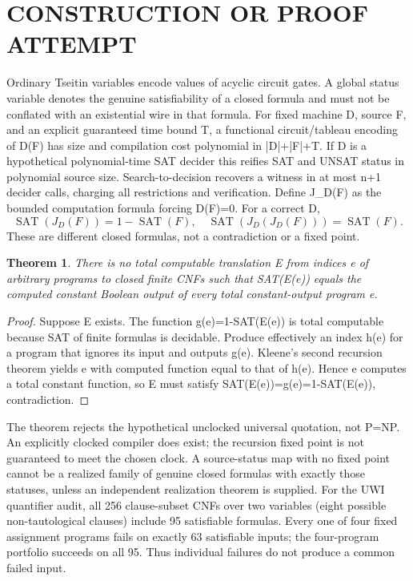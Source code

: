 \documentclass{article}
\newtheorem{theorem}{Theorem}
\begin{document}
\section{CONSTRUCTION OR PROOF ATTEMPT}
Ordinary Tseitin variables encode values of acyclic circuit gates. A global status variable denotes the genuine satisfiability of a closed formula and must not be conflated with an existential wire in that formula.
For fixed machine D, source F, and an explicit guaranteed time bound T, a functional circuit/tableau encoding of D(F) has size and compilation cost polynomial in |D|+|F|+T. If D is a hypothetical polynomial-time SAT decider this reifies SAT and UNSAT status in polynomial source size. Search-to-decision recovers a witness in at most n+1 decider calls, charging all restrictions and verification.
Define J_D(F) as the bounded computation formula forcing D(F)=0. For a correct D,
\[
\operatorname{SAT}(J_D(F))=1-\operatorname{SAT}(F),\quad
\operatorname{SAT}(J_D(J_D(F)))=\operatorname{SAT}(F).
\]
These are different closed formulas, not a contradiction or a fixed point.
\begin{theorem}
There is no total computable translation E from indices e of arbitrary programs to closed finite CNFs such that SAT(E(e)) equals the computed constant Boolean output of every total constant-output program e.
\end{theorem}
\begin{proof}
Suppose E exists. The function g(e)=1-SAT(E(e)) is total computable because SAT of finite formulas is decidable. Produce effectively an index h(e) for a program that ignores its input and outputs g(e). Kleene's second recursion theorem yields e with computed function equal to that of h(e). Hence e computes a total constant function, so E must satisfy SAT(E(e))=g(e)=1-SAT(E(e)), contradiction.
\end{proof}
The theorem rejects the hypothetical unclocked universal quotation, not P=NP. An explicitly clocked compiler does exist; the recursion fixed point is not guaranteed to meet the chosen clock. A source-status map with no fixed point cannot be a realized family of genuine closed formulas with exactly those statuses, unless an independent realization theorem is supplied.
For the UWI quantifier audit, all 256 clause-subset CNFs over two variables (eight possible non-tautological clauses) include 95 satisfiable formulas. Every one of four fixed assignment programs fails on exactly 63 satisfiable inputs; the four-program portfolio succeeds on all 95. Thus individual failures do not produce a common failed input.
\end{document}
